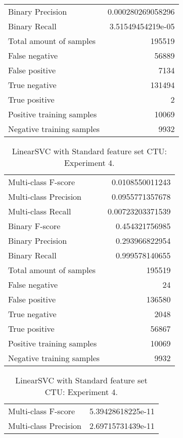 \begin{table}[H]
\begin{minipage}{0.5\textwidth}
\begin{tabular}{l r}
Binary Precision & 0.000280269058296 \\
Binary Recall & 3.51549454219e-05 \\
\midrule
Total amount of samples & 195519 \\
False negative & 56889 \\
False positive & 7134 \\
True negative & 131494 \\
True positive & 2 \\
\midrule
Positive training samples & 10069 \\
Negative training samples & 9932 \\
\bottomrule
\end{tabular}
\end{minipage}
\end{table}
\begin{table}[H]
\begin{minipage}{0.5\textwidth}
\caption{LinearSVC with Standard feature set CTU: Experiment 3.}
\centering
\begin{tabular}{l r}
\toprule
Multi-class F-score & 0.0108550011243 \\
Multi-class Precision & 0.0955771357678 \\
Multi-class Recall & 0.00723203371539 \\
\midrule
Binary F-score & 0.454321756985 \\
Binary Precision & 0.293966822954 \\
Binary Recall & 0.999578140655 \\
\midrule
Total amount of samples & 195519 \\
False negative & 24 \\
False positive & 136580 \\
True negative & 2048 \\
True positive & 56867 \\
\midrule
Positive training samples & 10069 \\
Negative training samples & 9932 \\
\bottomrule
\end{tabular}
\end{minipage}
\hfillx
\begin{minipage}{0.5\textwidth}
\caption{LinearSVC with Standard feature set CTU: Experiment 4.}
\centering
\begin{tabular}{l r}
\toprule
Multi-class F-score & 5.39428618225e-11 \\
Multi-class Precision & 2.69715731439e-11 \\

\end{tabular}
\end{minipage}
\end{table}
